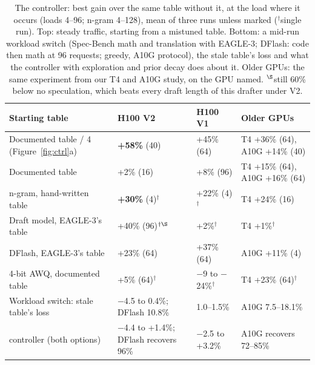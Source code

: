 \documentclass{article}
\begin{document}
\begin{table}[t]
\centering
\small
\caption{The controller: best gain over the same table without it, at the load where it occurs (loads 4--96; n-gram 4--128), mean of three runs unless marked ($^\dagger$single run). Top: steady traffic, starting from a mistuned table. Bottom: a mid-run workload switch (Spec-Bench math and translation with EAGLE-3; DFlash: code then math at 96 requests; greedy, A10G protocol), the stale table's loss and what the controller with exploration and prior decay does about it. Older GPUs: the same experiment from our T4 and A10G study, on the GPU named. $^\S$still 60\% below no speculation, which beats every draft length of this drafter under V2.}
\label{tab:ctrl}
\vspace{3pt}
\setlength{\tabcolsep}{6pt}
\begin{tabular}{@{}llll@{}}
\toprule
Starting table & H100 V2 & H100 V1 & Older GPUs \\
\midrule
Documented table / 4 (Figure~\ref{fig:ctrl}a) & \textbf{+58\%} (40) & +45\% (64) & T4 +36\% (64), A10G +14\% (40) \\
Documented table & +2\% (16) & +8\% (96) & T4 +15\% (64), A10G +16\% (64) \\
n-gram, hand-written table & \textbf{+30\%} (4)$^\dagger$ & +22\% (4)$^\dagger$ & T4 +24\% (16) \\
Draft model, EAGLE-3's table & +40\% (96)$^{\dagger\S}$ & +2\%$^\dagger$ & T4 +1\%$^\dagger$ \\
DFlash, EAGLE-3's table & +23\% (64) & +37\% (64) & A10G +11\% (4) \\
4-bit AWQ, documented table & +5\% (64)$^\dagger$ & $-$9 to $-$24\%$^\dagger$ & T4 +23\% (64)$^\dagger$ \\
\midrule
Workload switch: stale table's loss & $-$4.5 to 0.4\%; DFlash 10.8\% & 1.0--1.5\% & A10G 7.5--18.1\% \\
\quad controller (both options) & $-$4.4 to +1.4\%; DFlash recovers 96\% & $-$2.5 to +3.2\% & A10G recovers 72--85\% \\
\bottomrule
\end{tabular}
\vspace{-3mm}
\end{table}
\end{document}
